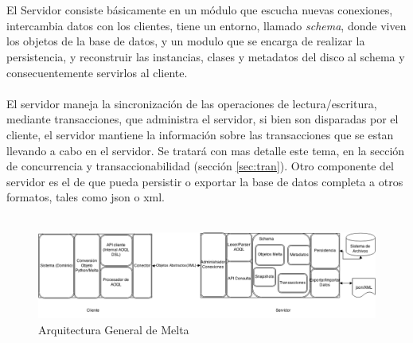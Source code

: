 \documentclass{melta}
\begin{document}
\\\\
El Servidor consiste básicamente en un módulo que escucha nuevas conexiones, intercambia datos con los clientes, tiene un entorno, llamado \textit{schema}, donde viven los objetos de la base de datos, y un modulo que se encarga de realizar la persistencia, y reconstruir las instancias, clases y metadatos del disco al schema y consecuentemente servirlos al cliente.  
\\\\
El servidor maneja la sincronización de las operaciones de lectura/escritura, mediante transacciones, que administra el servidor, si bien son disparadas por el cliente, el servidor mantiene la información sobre las transacciones que se estan llevando a cabo en el servidor. Se tratará con mas detalle este tema, en la sección de concurrencia y transaccionabilidad (sección \ref{sec:tran}).
Otro componente del servidor es el de que pueda persistir o exportar la base de datos completa a otros formatos, tales como json o xml.
\\\\
\begin{figure}
\centering
\includegraphics[width=19cm]{MeltaArchitecture}
\caption{Arquitectura General de Melta}
\label{fig:flies}
\end{figure}
\end{document}
